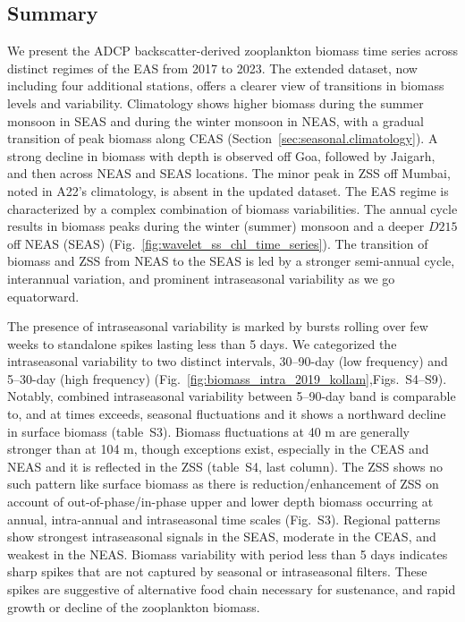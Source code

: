 \documentclass[authoryear,review,11pt]{elsarticle}
\begin{document}
\subsection{Summary}
\label{sec:discuss.summary}

We present the ADCP backscatter-derived zooplankton biomass time series across distinct regimes of the EAS from 2017 to 2023. The extended dataset, now including four additional stations, offers a clearer view of transitions in biomass levels and variability. Climatology shows higher biomass during the summer monsoon in SEAS and during the winter monsoon in NEAS, with a gradual transition of peak biomass along CEAS (Section~\ref{sec:seasonal.climatology}). A strong decline in biomass with depth is observed off Goa, followed by Jaigarh, and then across NEAS and SEAS locations. The minor peak in ZSS off Mumbai, noted in A22's climatology, is absent in the updated dataset. The EAS regime is characterized by a complex combination of biomass variabilities. The annual cycle results in biomass peaks during the winter (summer) monsoon and a deeper $D215$ off NEAS (SEAS) (Fig.~\ref{fig:wavelet_ss_chl_time_series}). The transition of biomass and ZSS from NEAS to the SEAS is led by a stronger semi-annual cycle, interannual variation, and prominent intraseasonal variability as we go equatorward.

The presence of intraseasonal variability is marked by bursts rolling over few weeks to standalone spikes lasting less than 5 days. We categorized the intraseasonal variability to two distinct intervals, 30--90-day (low frequency) and 5--30-day (high frequency) (Fig.~\ref{fig:biomass_intra_2019_kollam},Figs.~S4--S9). Notably, combined intraseasonal variability between 5--90-day band is comparable to, and at times exceeds, seasonal fluctuations and it shows a northward decline in surface biomass (table~S3). Biomass fluctuations at 40 m are generally stronger than at 104 m, though exceptions exist, especially in the CEAS and NEAS and it is reflected in the ZSS (table~S4, last column). The ZSS shows no such pattern like surface biomass as there is reduction/enhancement of ZSS on account of out-of-phase/in-phase upper and lower depth biomass occurring at annual, intra-annual and intraseasonal time scales (Fig.~S3). Regional patterns show strongest intraseasonal signals in the SEAS, moderate in the CEAS, and weakest in the NEAS. Biomass variability with period less than 5 days indicates sharp spikes that are not captured by seasonal or intraseasonal filters. These spikes are suggestive of alternative food chain necessary for sustenance, and rapid growth or decline of the zooplankton biomass.
\end{document}
